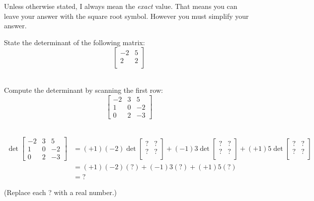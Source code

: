 

\renewcommand\AUTHOR{jdoe5@cougars.ccis.edu} %


\topmattertwo

\newcommand\vv[2]{ \left\langle #1, #2 \right\rangle }
\newcommand\vvv[3]{ \left\langle #1, #2, #3 \right\rangle }

Unless otherwise stated, I always mean the {\it exact} value.
That means you can leave your answer with the square root symbol.
However you must simplify your answer.

\nextq 
State the determinant of the following matrix:
\[
\begin{bmatrix}
-2 & 5 \\
 2 & 2 \\
\end{bmatrix}
\]
\\
\ANSWER
\begin{answerlong}

\end{answerlong}

\nextq
Compute the determinant by scanning the first row:
\[
\begin{bmatrix}
-2 & 3 &  5 \\
 1 & 0 & -2 \\
 0 & 2 & -3
\end{bmatrix}
\]
\\
\ANSWER
\begin{answerlong}
\begin{align*}
\det
\begin{bmatrix}
-2 & 3 &  5 \\
 1 & 0 & -2 \\
 0 & 2 & -3
\end{bmatrix}
&= (+1)(-2)
   \det
   \begin{bmatrix}
    ? & ?  \\
    ? & ?  \\
   \end{bmatrix}
   +
   (-1)3
   \det
   \begin{bmatrix}
    ? & ?  \\
    ? & ?  \\
   \end{bmatrix}
   +
   (+1)5
   \det
   \begin{bmatrix}
    ? & ?  \\
    ? & ?  \\
   \end{bmatrix}
   \\
&= (+1)(-2)(?)
   +
   (-1)3(?)
   +
   (+1)5(?)   \\
&= ?
\end{align*}
\end{answerlong}
(Replace each ? with a real number.)

